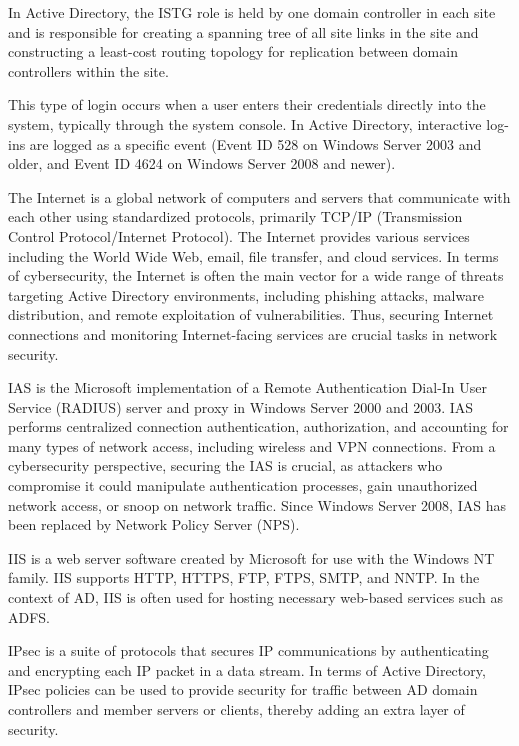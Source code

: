  In Active Directory, the ISTG role is held by one domain controller in each site and is responsible for creating a spanning tree of all site links in the site and constructing a least-cost routing topology for replication between domain controllers within the site.

 This type of login occurs when a user enters their credentials directly into the system, typically through the system console. In Active Directory, interactive log-ins are logged as a specific event (Event ID 528 on Windows Server 2003 and older, and Event ID 4624 on Windows Server 2008 and newer).

 The Internet is a global network of computers and servers that communicate with each other using standardized protocols, primarily TCP/IP (Transmission Control Protocol/Internet Protocol). The Internet provides various services including the World Wide Web, email, file transfer, and cloud services. In terms of cybersecurity, the Internet is often the main vector for a wide range of threats targeting Active Directory environments, including phishing attacks, malware distribution, and remote exploitation of vulnerabilities. Thus, securing Internet connections and monitoring Internet-facing services are crucial tasks in network security.

 IAS is the Microsoft implementation of a Remote Authentication Dial-In User Service (RADIUS) server and proxy in Windows Server 2000 and 2003. IAS performs centralized connection authentication, authorization, and accounting for many types of network access, including wireless and VPN connections. From a cybersecurity perspective, securing the IAS is crucial, as attackers who compromise it could manipulate authentication processes, gain unauthorized network access, or snoop on network traffic. Since Windows Server 2008, IAS has been replaced by Network Policy Server (NPS).

 IIS is a web server software created by Microsoft for use with the Windows NT family. IIS supports HTTP, HTTPS, FTP, FTPS, SMTP, and NNTP. In the context of AD, IIS is often used for hosting necessary web-based services such as ADFS.

 IPsec is a suite of protocols that secures IP communications by authenticating and encrypting each IP packet in a data stream. In terms of Active Directory, IPsec policies can be used to provide security for traffic between AD domain controllers and member servers or clients, thereby adding an extra layer of security.

